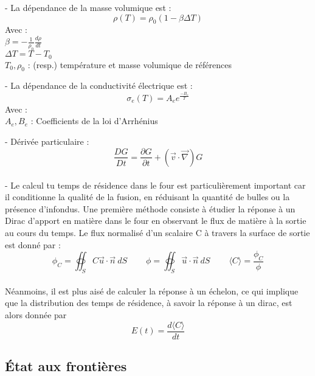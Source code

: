 \documentclass[12pt, a4paper, french, BCOR = 0pt, DIV = 10]{scrartcl}
\begin{document}
	
	\raggedright
	- La dépendance de la masse volumique est :
	$$ \rho(T) = \rho_{0}  (1 - \beta \Delta T) $$
    \setlength{\parindent}{20pt}
    Avec : \\
    $\beta = -\frac{1}{\rho_{0}} \frac{d\rho}{dt}$\\
    $\Delta T = T-T_0$\\
    $T_0, \rho_0$ : (resp.) température et masse volumique de références\\[0.5 cm]
	\setlength{\parindent}{0pt}
	
	
	- La dépendance de la conductivité électrique est :
    $$ \sigma_{e} (T) =  A_{e} e^{\frac{-B_{e}}{T}}	$$
    \setlength{\parindent}{20pt}
    Avec :\\
    $A_e,B_e$ : Coefficients de la loi d'Arrhénius\break\\[0.5 cm]
    \setlength{\parindent}{0pt}
    
	- Dérivée particulaire : \\
	$$ \frac{DG}{Dt}=\frac{\partial G}{\partial t} + (\vec {v} \cdot \vec {\nabla } ) G
	$$\\[0.5cm]
	
	
	
	- Le calcul tu temps de résidence dans le four est particulièrement important car il conditionne la qualité de la fusion, en réduisant la quantité de bulles ou la présence d'infondus. Une première méthode consiste à étudier la réponse à un Dirac d'apport en matière dans le four en observant le flux de matière à la sortie au cours du temps. Le flux normalisé d'un scalaire C à travers la surface de sortie est donné par :\\[0.3 cm]
	$$
	\phi_{C} =  \oiint_S C\vec{u} \cdot \vec{n}~dS  ~~~~~~~~~~ \phi = \oiint_S \vec{u} \cdot \vec{n}~dS  ~~~~~~~~~~
	\langle C \rangle = \frac{\phi_{C}}{\phi}
	$$ 
	\\ [0.5 cm]
	Néanmoins, il est plus aisé de calculer la réponse à un échelon, ce qui implique que la distribution des temps de résidence, à savoir la réponse à un dirac, est alors donnée par \[E(t)=\frac{d\langle C \rangle}{dt}\]
	
	\subsection{État aux frontières}
	
\end{document}
